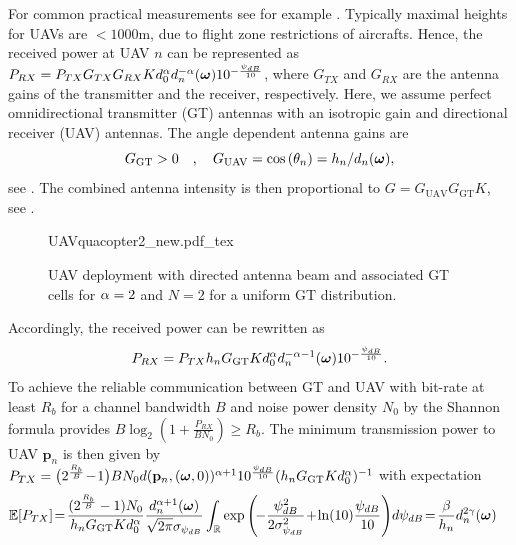 \documentclass[12pt,onecolumn,final,letterpaper]{IEEEtran}
\newcounter{example}[section]
\renewcommand{\vq}{\mathbf p}
\newcommand{\Rb}{\ensuremath{R_b}}         %
\newcommand{\GGT}{\ensuremath{G_{\text{GT}}}}         %
\newcommand{\GUAV}{\ensuremath{G_{\text{UAV}}}}         %
\begin{document}
%
For common practical measurements see for example \cite{AG18}.  Typically
maximal heights for UAVs are $<1000$m, due to flight zone restrictions of aircrafts.  Hence, the received power at
UAV $n$ can be represented as
%
$P_{RX}=P_{TX}G_{TX}G_{RX}Kd^{\alpha}_0 d_n^{-\alpha}(\boldsymbol{ \omega})10^{-\frac{\psi_{dB}}{10}}$,
%
where $G_{TX}$ and $G_{RX}$ are the antenna gains of the transmitter and the receiver, respectively. Here, we assume
perfect omnidirectional transmitter (GT) antennas with an isotropic gain and directional receiver (UAV) antennas.  The
angle dependent antenna gains are %
%
\begin{equation}
\GGT >0\quad,\quad
  \GUAV = \cos\left(\theta_n\right)=h_n/d_n(\vome),
\label{eq:Gdirected}
\end{equation}
%
see \cite[p.52]{Bal05a}. The combined antenna intensity is then proportional to
%
$G=\GUAV \GGT K$, see .
%
\begin{figure}
  \centering
  \def\svgwidth{.85\textwidth} \scriptsize{
    {UAVquacopter2_new.pdf_tex}}
    \caption{UAV deployment with directed antenna beam and associated GT cells for $\alpha=2$ and $N=2$ for a uniform GT distribution.}
    \label{fig:uavdirected}
\end{figure}
%
Accordingly, the received power can be rewritten as
%
\begin{equation}
  P_{RX}=P_{TX}h_n \GGT K d^{\alpha}_0 d_n^{-\alpha-1}(\vome)10^{-\frac{\psi_{dB}}{10}}.
\end{equation}
%
To achieve the reliable communication between GT and UAV with bit-rate at least $\Rb$ for a
channel bandwidth $B$  and noise power density $N_0$ by the Shannon formula provides 
$B\log_2\left(1+\frac{P_{RX}}{BN_0}\right)\ge\Rb$.
The minimum transmission power to UAV $\vq_n$ is then given by
$P_{TX}=\big(2^{\frac{\Rb}{B}}\!-\!1\big)B N_0d(\vq_n,(\vome,0))^{\alpha+1}10^{\frac{\psi_{dB}}{10}} (h_n \GGT
Kd^{\alpha}_0)^{-1}$ with expectation
%
%
%
\begin{align}
\Expect{P_{TX}}&\! =\!
  \frac{(2^{\frac{\Rb}{B}}-1)N_0 }{ h_n \GGT Kd^{\alpha}_0}
  \frac{d_n^{\alpha+1}(\vome)}{\sqrt{2\pi}\sigma_{\psi_{dB}}} \int_{\R}
     \exp\left(\!-\frac{\psi^2_{dB}}{2\sigma^2_{\psi_{dB}}} \!+\! \ln(10) \frac{\psi_{dB}}{10}\right)\!d\psi_{dB}
     \!=\!\frac{\bet}{h_n}  d_n^{2\gam}(\vome)\label{eq:expectedTX} %
\end{align}
\end{document}
